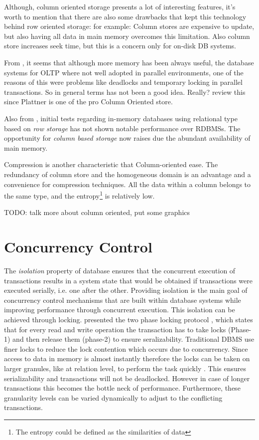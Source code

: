\documentclass[12pt]{article} %
\begin{document}
Although, column oriented storage presents a lot of interesting features, it's worth to mention that there are also some drawbacks that kept this technology behind row oriented storage: for example: Column stores are expensive to update, but also having all data in main memory overcomes this limitation. Also column store increases seek time, but this is a concern only for on-disk DB systems.

From \cite{Plattner}, it seems that although more memory has been always useful, the database systems for OLTP where not well adopted in parallel environments, one of the reasons of this were problems like deadlocks and temporary locking in parallel transactions. So in general terms has not been a good idea. Really? review this since Plattner is one of the pro Column Oriented store.

Also from \cite{Plattner}, initial tests regarding in-memory databases using relational type based on \emph{ row storage } has not shown notable performance over RDBMSs. The opportunity for \emph{column based storage} now raises due the abundant availability of main memory. 

Compression is another characteristic that Column-oriented ease. The redundancy of column store and the homogeneous domain is an advantage and a convenience for compression techniques. All the data within a column belongs to the same type, and the entropy\footnote{The entropy could be defined as the similarities of data} is relatively low. 

TODO: talk more about column oriented, put some graphics

\section{Concurrency Control}
The \emph{isolation} property of database ensures that the concurrent execution of transactions results in a system state that would be obtained if transactions were executed serially, i.e. one after the other. Providing isolation is the main goal of concurrency control mechanisms that are built within database systems while improving performance through concurrent execution. This isolation can be achieved through locking. \citeauthor{gray1993transaction} presented the two phase locking protocol \cite{gray1993transaction}, which states that for every read and write operation the transaction has to take locks (Phase-1) and then release them (phase-2) to ensure seralizability. Traditional DBMS use finer locks to reduce the lock contention which occurs due to concurrency. Since access to data in memory is almost instantly therefore the locks can be taken on larger granules, like at relation level, to perform the task quickly \cite{garcia1992main}. This ensures serializability and transactions will not be deadlocked. However in case of longer transactions this becomes the bottle neck of performance. Furthermore, these granularity levels can be varied dynamically to adjust to the conflicting transactions\cite{lehman1989concurrency}.
\end{document}
